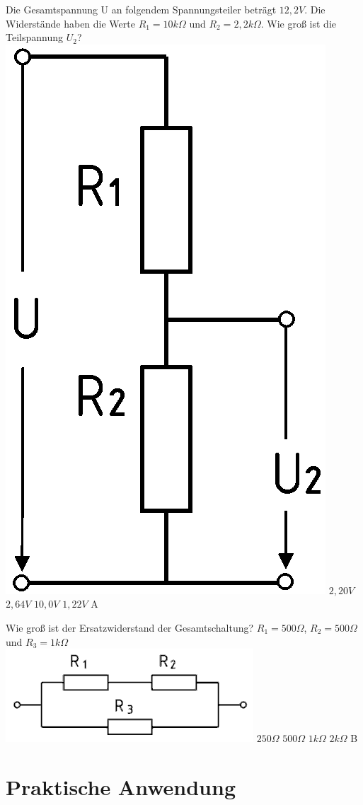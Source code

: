 {Die Gesamtspannung U an folgendem Spannungsteiler beträgt $12,2V$. Die Widerstände haben die Werte $R_1 = 10k\Omega$ und $R_2 = 2,2k\Omega$. Wie groß ist die Teilspannung $U_2$?\\ \includegraphics[scale=0.15]{SSW/Bilder/Spannungsteiler.png}}%
{$2,20V$}%
{$2,64V$}%
{$10,0V$}%
{$1,22V$}%
{A}%

{Wie groß ist der Ersatzwiderstand der Gesamtschaltung? 
$R_1 = 500\Omega$, $R_2 = 500\Omega$ und $R_3 = 1k\Omega$\\ \includegraphics[scale=0.4]{SSW/Bilder/Parallelschaltung.png}}%
{$250\Omega$}%
{$500\Omega$}%
{$1k\Omega$}%
{$2k\Omega$}%
{B}%

\clearpage

\section*{Praktische Anwendung}

